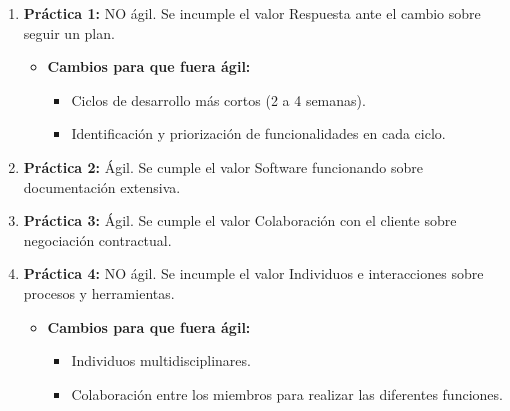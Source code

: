 \begin{solucion}
    \begin{enumerate}
        \item \textbf{Práctica 1:} NO ágil.
        Se incumple el valor Respuesta ante el cambio sobre seguir un plan.
        \begin{itemize}
            \item \textbf{Cambios para que fuera ágil:}
            \begin{itemize}
                \item Ciclos de desarrollo más cortos (2 a 4 semanas).
                \item Identificación y priorización de funcionalidades en cada ciclo.
            \end{itemize}
        \end{itemize}

        \item \textbf{Práctica 2:} Ágil.
        Se cumple el valor Software funcionando sobre documentación extensiva.

        \item \textbf{Práctica 3:} Ágil.
        Se cumple el valor Colaboración con el cliente sobre negociación contractual.

        \item \textbf{Práctica 4:} NO ágil.
        Se incumple el valor Individuos e interacciones sobre procesos y herramientas.
        \begin{itemize}
            \item \textbf{Cambios para que fuera ágil:}
            \begin{itemize}
                \item Individuos multidisciplinares.
                \item Colaboración entre los miembros para realizar las diferentes funciones.
            \end{itemize}
        \end{itemize}
    \end{enumerate}
\end{solucion}
